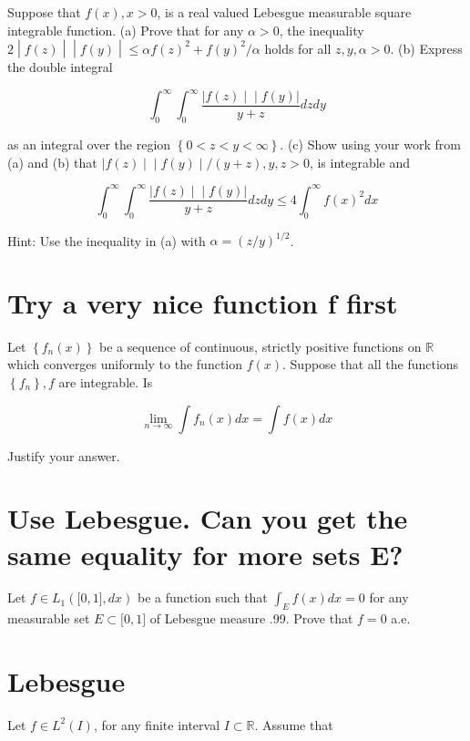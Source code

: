 \documentclass{qlnotes-export}
\begin{document}
Suppose that \(f(x),x > 0\), is a real valued Lebesgue measurable square integrable function. (a) Prove that for any \(\alpha > 0\), the inequality \(\left. 2 \middle| f(z) \middle| \middle| f(y) \middle| \leq \alpha f(z)^{2} + f(y)^{2}/\alpha \right.\) holds for all \(z,y,\alpha > 0\). (b) Express the double integral

\[\int_{0}^{\infty}\int_{0}^{\infty}\frac{\left. |f(z) \middle| \middle| f(y)| \right.}{y + z}dzdy\]

as an integral over the region \(\left\{ {0 < z < y < \infty} \right\}\). (c) Show using your work from (a) and (b) that \(\left. |f(z) \middle| \middle| f(y) \middle| /(y + z),y,z > 0 \right.\), is integrable and

\[\int_{0}^{\infty}\int_{0}^{\infty}\frac{\left. |f(z) \middle| \middle| f(y)| \right.}{y + z}dzdy \leq 4\int_{0}^{\infty}f(x)^{2}dx\]

Hint: Use the inequality in (a) with \(\alpha = (z/y)^{1/2}\).

\chapter{Try a very nice function f first}\label{try-a-very-nice-function-f-first}

Let \(\left\{ {f_{n}(x)} \right\}\) be a sequence of continuous, strictly positive functions on \(\mathbb{R}\) which converges uniformly to the function \(f(x)\). Suppose that all the functions \(\left\{ f_{n} \right\},f\) are integrable. Is

\[\lim\limits_{n\rightarrow\infty}\int f_{n}(x)dx = \int f(x)dx\]

Justify your answer.

\chapter{Use Lebesgue. Can you get the same equality for more sets E?}

Let \(f \in L_{1}(\lbrack 0,1\rbrack,dx)\) be a function such that \(\int_{E}f(x)dx = 0\) for any measurable set \(E \subset \lbrack 0,1\rbrack\) of Lebesgue measure .99. Prove that \(f = 0\) a.e.

\chapter{Lebesgue}\label{lebesgue}

Let \(f \in L^{2}(I)\), for any finite interval \(I \subset {\mathbb{R}}\). Assume that
\end{document}
